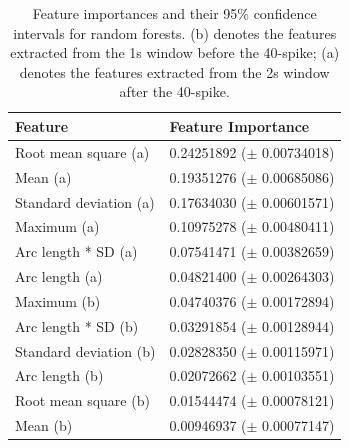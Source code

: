 
\begin{table}[t]
\centering
\caption{Feature importances and their 95\% confidence intervals for random forests. (b) denotes the features extracted from the 1s window before the 40-spike; (a) denotes the features extracted from the 2s window after the 40-spike.}
\begin{tabular}{@{}ll@{}}
\toprule
Feature                & Feature Importance \\ \midrule
Root mean square (a)   & 0.24251892 ($\pm$ 0.00734018)         \\
Mean (a)               & 0.19351276 ($\pm$ 0.00685086)         \\
Standard deviation (a) & 0.17634030 ($\pm$ 0.00601571)         \\
Maximum (a)            & 0.10975278 ($\pm$ 0.00480411)         \\
Arc length * SD (a)    & 0.07541471 ($\pm$ 0.00382659)         \\
Arc length (a)         & 0.04821400 ($\pm$ 0.00264303)         \\
Maximum (b)            & 0.04740376 ($\pm$ 0.00172894)         \\
Arc length * SD (b)    & 0.03291854 ($\pm$ 0.00128944)         \\
Standard deviation (b) & 0.02828350 ($\pm$ 0.00115971)         \\
Arc length (b)         & 0.02072662 ($\pm$ 0.00103551)         \\
Root mean square (b)   & 0.01544474 ($\pm$ 0.00078121)         \\
Mean (b)               & 0.00946937 ($\pm$ 0.00077147)          \\ \bottomrule
\end{tabular}
\label{tbl:importance-rf}
\end{table}




